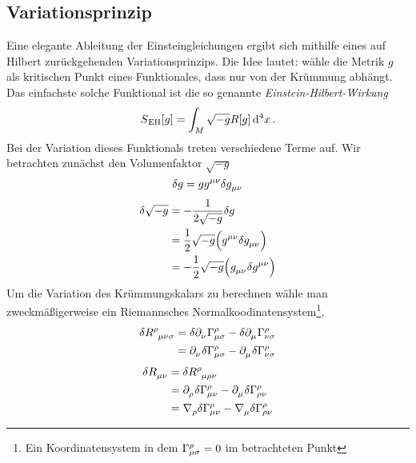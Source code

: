 \subsection{Variationsprinzip}
Eine elegante Ableitung der Einsteingleichungen ergibt sich mithilfe eines auf
Hilbert zurückgehenden Variationsprinzips. 
Die Idee lautet: wähle die Metrik $g$ als kritischen
Punkt eines Funktionales, dass nur von der Krümmung abhängt. Das
einfachste solche Funktional ist die so genannte
\emph{Einstein-Hilbert-Wirkung}
\begin{equation}
S\textsubscript{EH}[g]=\int_{M}\sqrt{-g}R[g] \dif{}^4x \,.
\end{equation}
Bei der Variation dieses Funktionals treten verschiedene Terme auf. Wir
betrachten zunächst den Volumenfaktor $\sqrt{-g}$
\begin{equation}
\delta g = g  \tensor{g}{^\mu^\nu}\delta\tensor{g}{_\mu_\nu}
\end{equation}
\begin{equation}
\begin{split}
\delta \sqrt{-g} 
&= -\frac{1}{2\sqrt{-g}}\delta g \\
&= \frac{1}{2} \sqrt{-g} \left(\tensor{g}{^\mu^\nu} \delta
\tensor{g}{_\mu_\nu}\right)\\
&= -\frac{1}{2} \sqrt{-g} \left(\tensor{g}{_\mu_\nu} \delta
\tensor{g}{^\mu^\nu}\right)
\end{split}
\end{equation}
Um die Variation des Krümmungskalars zu berechnen wähle man zweckmäßigerweise
ein Riemannsches Normalkoodinatensystem\footnote{Ein Koordinatensystem in dem
$\cSym{\rho}{\mu}{\sigma}=0$ im betrachteten Punkt},
\begin{equation}
\begin{split}
\delta \tensor{R}{^\rho_\mu_\nu_\sigma}
&=\delta \tensor{\partial}{_\nu}\cSym{\rho}{\mu}{\sigma}
-\delta \tensor{\partial}{_\mu}\cSym{\rho}{\nu}{\sigma}\\
&=\tensor{\partial}{_\nu}\delta \cSym{\rho}{\mu}{\sigma}
-\tensor{\partial}{_\mu}\delta \cSym{\rho}{\nu}{\sigma}\\
\end{split}
\end{equation}
\begin{equation}
\begin{split}
\delta \tensor{R}{_\mu_\nu}
&=\delta \tensor{R}{^\rho_\mu_\rho_\nu}\\
&=\tensor{\partial}{_\rho}\delta \cSym{\rho}{\mu}{\nu}
-\tensor{\partial}{_\mu}\delta \cSym{\rho}{\rho}{\nu}\\
&=\tensor{\nabla}{_\rho}\delta \cSym{\rho}{\mu}{\nu}
-\tensor{\nabla}{_\mu}\delta \cSym{\rho}{\rho}{\nu}\\
\end{split}
\end{equation}
